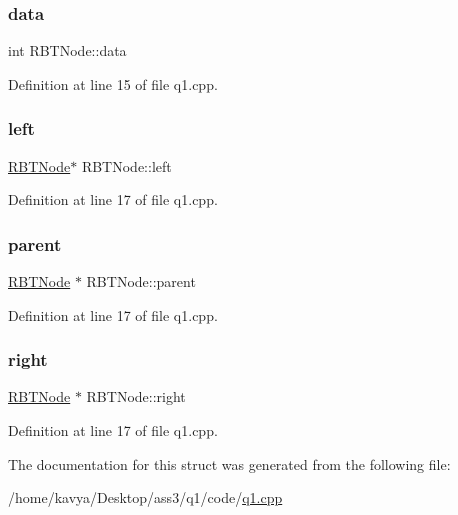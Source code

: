 \mbox{\label{struct_r_b_t_node_a3d765df58677c77bf9e3743938d41d0d}} 
\subsubsection{\texorpdfstring{data}{data}}
{\footnotesize\ttfamily int R\+B\+T\+Node\+::data}



Definition at line 15 of file q1.\+cpp.

\mbox{\label{struct_r_b_t_node_ab365a258e6d393e3a2b1b876a72b57b8}} 
\subsubsection{\texorpdfstring{left}{left}}
{\footnotesize\ttfamily \hyperlink{struct_r_b_t_node}{R\+B\+T\+Node}$\ast$ R\+B\+T\+Node\+::left}



Definition at line 17 of file q1.\+cpp.

\mbox{\label{struct_r_b_t_node_accf38a2652c418128932b2f13283ba8c}} 
\subsubsection{\texorpdfstring{parent}{parent}}
{\footnotesize\ttfamily \hyperlink{struct_r_b_t_node}{R\+B\+T\+Node} $\ast$ R\+B\+T\+Node\+::parent}



Definition at line 17 of file q1.\+cpp.

\mbox{\label{struct_r_b_t_node_a56bcde7ab9200c37bcbeb736b7b3cd06}} 
\subsubsection{\texorpdfstring{right}{right}}
{\footnotesize\ttfamily \hyperlink{struct_r_b_t_node}{R\+B\+T\+Node} $\ast$ R\+B\+T\+Node\+::right}



Definition at line 17 of file q1.\+cpp.



The documentation for this struct was generated from the following file\+:\begin{DoxyCompactItemize}
\item 
/home/kavya/\+Desktop/ass3/q1/code/\hyperlink{q1_8cpp}{q1.\+cpp}\end{DoxyCompactItemize}
